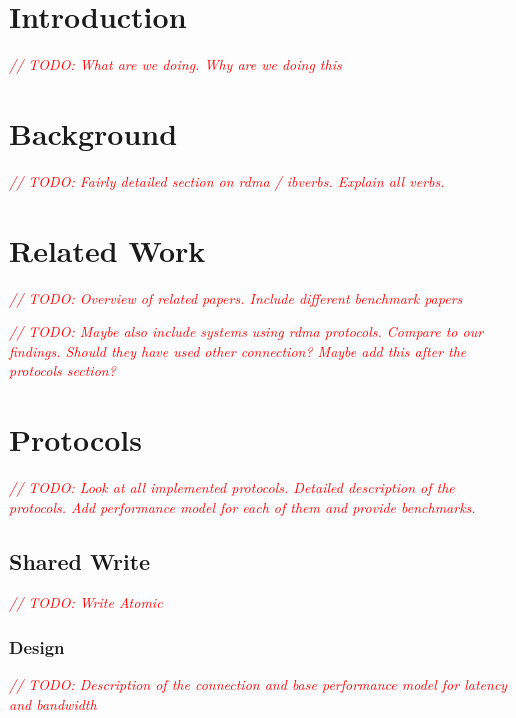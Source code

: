 \documentclass{article}
\newcommand{\todo}[1]{\textit{\textcolor{red}{// TODO: #1} }}
\theoremstyle{plain}
\theoremstyle{definition}
\theoremstyle{remark}
\begin{document}
\iffalse
\fi
\newcommand{\seqnode}[3][]{ 
  \node[#1] (#2) {#3};
  \node[below of=#2, node distance=5cm] (#2_g) {};
  \draw (#2) -- (#2_g);
}
\newcommand{\hseqnode}[3][]{ 
  \node[#1] (#2) {#3};
  \node[below of=#2, node distance=5cm] (#2_g) {};
}
\newcommand{\msg}[5][above]{
  \draw[->] ($(#2)!#4!(#2_g)$) -- node[#1,scale=0.75,midway]{#5} ($(#3)!#4+0.04!(#3_g)$);
}
\newcommand{\fetch}[4]{
  \draw[-] ($(#1)!#3-0.04!(#1_g)$) -- node[above,scale=0.75,midway]{#4} ($(#2)!#3!(#2_g)$);
  \draw[->] ($(#2)!#3!(#2_g)$) -- node[above,scale=0.75,midway]{} ($(#1)!#3+0.04!(#1_g)$);
}

\tableofcontents
\pagebreak
\section{Introduction}
\todo{What are we doing. Why are we doing this}

\pagebreak
\section{Background}
\todo{Fairly detailed section on rdma / ibverbs. Explain all verbs.}


\pagebreak
\section{Related Work}

\todo{Overview of related papers. Include different benchmark papers}

\todo{Maybe also include systems using rdma protocols. Compare to our findings. Should they have used other connection? 
Maybe add this after the protocols section?}

\pagebreak


\pagebreak
\section{Protocols}
\todo{Look at all implemented protocols. Detailed description of the protocols. Add performance model for each of them and provide benchmarks.}

\pagebreak


\pagebreak


\pagebreak
\subsection{Shared Write}
\todo{Write Atomic}
\subsubsection{Design}
\todo{Description of the connection and base performance model for latency and bandwidth}
\end{document}
